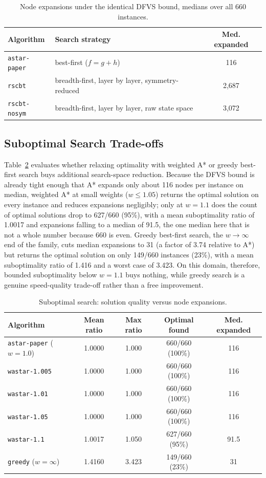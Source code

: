 \documentclass[letterpaper]{article}
\begin{document}
\begin{table}[t]
\centering
\footnotesize
\caption{Node expansions under the identical DFVS bound, medians over all
660 instances.}
\label{tab:rscbt}
\begin{tabular}{lp{2.7cm}c}
\hline
Algorithm & Search strategy & Med. expanded \\
\hline
\texttt{astar-paper} & best-first ($f=g+h$) & 116 \\
\texttt{rscbt} & breadth-first, layer by layer, symmetry-reduced & 2{,}687 \\
\texttt{rscbt-nosym} & breadth-first, layer by layer, raw state space & 3{,}072 \\
\hline
\end{tabular}
\end{table}

\subsection{Suboptimal Search Trade-offs}

Table~\ref{tab:suboptimal} evaluates whether relaxing optimality with
weighted A* or greedy best-first search buys additional search-space
reduction. Because the DFVS bound is already tight enough that A* expands
only about 116 nodes per instance on median, weighted A* at small weights
($w \le 1.05$) returns the optimal solution on every instance
and reduces expansions negligibly; only at $w = 1.1$ does the count of
optimal solutions drop to 627/660 (95\%), with a mean suboptimality ratio
of 1.0017 and expansions falling to a median of 91.5, the one median here
that is not a whole number because 660 is even. Greedy best-first
search, the $w \to \infty$ end of the family, cuts median expansions to 31
(a factor of 3.74 relative to A*) but returns the optimal solution on
only 149/660 instances (23\%), with a mean suboptimality ratio of 1.416
and a worst case of 3.423. On this domain, therefore, bounded suboptimality
below $w=1.1$ buys nothing, while greedy search is a genuine
speed-quality trade-off rather than a free improvement.

\begin{table}[t]
\centering
\footnotesize
\caption{Suboptimal search: solution quality versus node expansions.}
\label{tab:suboptimal}
\begin{tabular}{lcccc}
\hline
Algorithm & Mean ratio & Max ratio & Optimal found & Med. expanded \\
\hline
\texttt{astar-paper} ($w=1.0$) & 1.0000 & 1.000 & 660/660 (100\%) & 116 \\
\texttt{wastar-1.005} & 1.0000 & 1.000 & 660/660 (100\%) & 116 \\
\texttt{wastar-1.01} & 1.0000 & 1.000 & 660/660 (100\%) & 116 \\
\texttt{wastar-1.05} & 1.0000 & 1.000 & 660/660 (100\%) & 116 \\
\texttt{wastar-1.1} & 1.0017 & 1.050 & 627/660 (95\%) & 91.5 \\
\texttt{greedy} ($w=\infty$) & 1.4160 & 3.423 & 149/660 (23\%) & 31 \\
\hline
\end{tabular}
\end{table}
\end{document}
